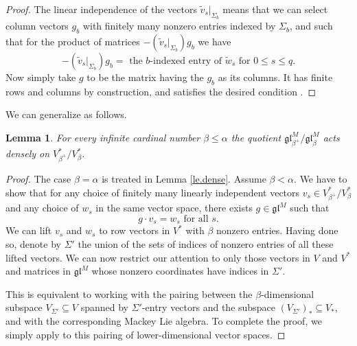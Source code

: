 \documentclass[11pt]{article}
\theoremstyle{plain}
\newtheorem{lemma}{Lemma}[section]
\theoremstyle{nonumberplain}
\theoremstyle{plain}
\theoremstyle{nonumberplain}
\newtheorem{proof}{Proof}
\newcommand\fgl{\mathfrak{gl}}
\begin{document}
\begin{proof}
 The linear independence of the
vectors $\tilde{v}_s|_{\Sigma_b}$ means that we can select column vectors
$g_b$ with finitely many nonzero entries indexed by $\Sigma_b$, and
such that for the product of matrices $-(\tilde{v}_s|_{\Sigma_b}) g_b$ we have
\begin{equation*}
  -(\tilde{v}_s|_{\Sigma_b}) g_b = \text{ the }b\text{-indexed entry of }\tilde{w}_s\text{ for } 0\le s\le q{.}
\end{equation*}
Now simply
take $g$ to be the matrix having the $g_b$ as its columns. It has
finite rows and columns by construction, and satisfies the desired
condition .
\end{proof}


We can generalize  as follows. 



\begin{lemma}\label{le.dense_gen}
  For every infinite cardinal number $\beta\le \alpha$ the quotient
  $\fgl^M_{\beta^+}/\fgl^M_\beta$ acts densely on
  $V^*_{\beta^+}/V^*_\beta$.
\end{lemma}
\begin{proof}
  The case $\beta=\alpha$ is treated in Lemma \ref{le.dense}.  Assume $\beta<\alpha$. We have to show that for any choice of finitely many linearly independent vectors
  $v_s\in V^*_{\beta^+}/V^*_\beta$ and any choice of
  $w_s$ in the same vector space, there exists $g\in \fgl^M$ such
  that
  \begin{equation*}
    g\cdot v_s = w_s\text{ for all }s.
  \end{equation*}
  We can lift $v_s$ and $w_s$ to row vectors in $V^*$ with
  $\beta$ nonzero entries. Having done so, denote by $\Sigma'$ the union of
  the sets of indices of nonzero entries of all these lifted vectors. We can now restrict our
  attention to only those vectors in $V$ and $V^*$ and matrices in
  $\fgl^M$ whose nonzero coordinates have indices in $\Sigma'$.

  This is equivalent to working with the pairing between the
  $\beta$-dimensional subspace $V_{\Sigma'}\subseteq V$ spanned by $\Sigma'$-entry
  vectors and the subspace $(V_{\Sigma'})_*\subseteq V_*$, and
  with the corresponding Mackey Lie algebra. To complete the proof, we simply apply
   to this pairing of lower-dimensional vector spaces.
\end{proof}
\end{document}
